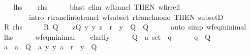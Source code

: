 \begin{isabellebody}
%
\isadelimproof
%
\endisadelimproof
%
\isatagproof
{}\isamarkupfalse%
\isanewline
\ \ \isamarkupfalse%
\ {\isacharquery}{\kern0pt}lhs\ \isamarkupfalse%
\ \isamarkupfalse%
\ {\isacharquery}{\kern0pt}rhs\isanewline
\ \ \ \ \isamarkupfalse%
\ {\isacharparenleft}{\kern0pt}blast\ elim{\isacharcolon}{\kern0pt}\ wf{\isacharunderscore}{\kern0pt}trancl\ {\isacharbrackleft}{\kern0pt}THEN\ wf{\isacharunderscore}{\kern0pt}irrefl{\isacharbrackright}{\kern0pt}\isanewline
\ \ \ \ \ \ \ \ intro{\isacharcolon}{\kern0pt}\ rtrancl{\isacharunderscore}{\kern0pt}into{\isacharunderscore}{\kern0pt}trancl{}\ wf{\isacharunderscore}{\kern0pt}subset\ rtrancl{\isacharunderscore}{\kern0pt}mono\ {\isacharbrackleft}{\kern0pt}THEN\ subsetD{\isacharbrackright}{\kern0pt}{\isacharparenright}{\kern0pt}\isanewline
{}\isamarkupfalse%
\isanewline
\ \ \isamarkupfalse%
\ R{\isacharcolon}{\kern0pt}\ {\isacharquery}{\kern0pt}rhs\isanewline
\ \ \isamarkupfalse%
\ \isamarkupfalse%
\ R{\isacharprime}{\kern0pt}{\isacharcolon}{\kern0pt}\ {\isachardoublequoteopen}Q\ {\isasymnoteq}\ {\isacharbraceleft}{\kern0pt}{\isacharbraceright}{\kern0pt}\ {\isasymLongrightarrow}\ {\isacharparenleft}{\kern0pt}{\isasymexists}z{\isasymin}Q{\isachardot}{\kern0pt}\ {\isasymforall}y{\isachardot}{\kern0pt}\ {\isacharparenleft}{\kern0pt}y{\isacharcomma}{\kern0pt}\ z{\isacharparenright}{\kern0pt}\ {\isasymin}\ r\ {\isasymlongrightarrow}\ y\ {\isasymnotin}\ Q{\isacharparenright}{\kern0pt}{\isachardoublequoteclose}\ \ Q\isanewline
\ \ \ \ \isamarkupfalse%
\ {\isacharparenleft}{\kern0pt}auto\ simp{\isacharcolon}{\kern0pt}\ wf{\isacharunderscore}{\kern0pt}eq{\isacharunderscore}{\kern0pt}minimal{\isacharparenright}{\kern0pt}\isanewline
\ \ \isamarkupfalse%
\ {\isacharquery}{\kern0pt}lhs\isanewline
\ \ \ \ \isamarkupfalse%
\ wf{\isacharunderscore}{\kern0pt}eq{\isacharunderscore}{\kern0pt}minimal\isanewline
\ \ \isamarkupfalse%
\ clarify\isanewline
\ \ \ \ \isamarkupfalse%
\ Q\ {\isacharcolon}{\kern0pt}{\isacharcolon}{\kern0pt}\ {\isachardoublequoteopen}{\isacharprime}{\kern0pt}a\ set{\isachardoublequoteclose}\ \ q\isanewline
\ \ \ \ \isamarkupfalse%
\ {\isachardoublequoteopen}q\ {\isasymin}\ Q{\isachardoublequoteclose}\isanewline
\ \ \ \ \isamarkupfalse%
\ \isamarkupfalse%
\ a\ \ {\isachardoublequoteopen}a\ {\isasymin}\ Q{\isachardoublequoteclose}\ \ a{\isacharcolon}{\kern0pt}\ {\isachardoublequoteopen}{\isasymAnd}y{\isachardot}{\kern0pt}\ {\isacharparenleft}{\kern0pt}y{\isacharcomma}{\kern0pt}\ a{\isacharparenright}{\kern0pt}\ {\isasymin}\ r\ {\isasymLongrightarrow}\ y\ {\isasymnotin}\ Q{\isachardoublequoteclose}\isanewline

\end{isabellebody}
